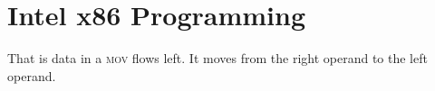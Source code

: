 

\chapter{Intel x86 Programming}






That is data in a \textsc{mov} flows left. It moves from the right operand to the left operand.
